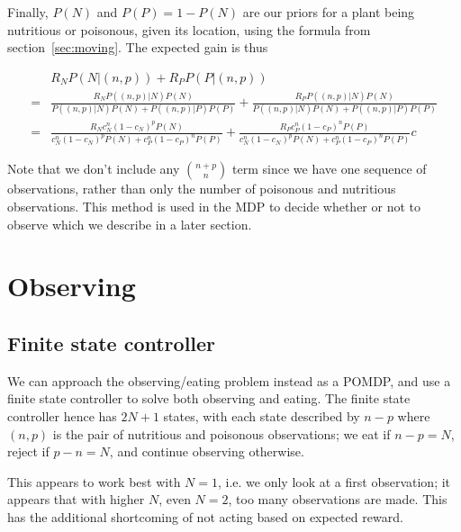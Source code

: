 \documentclass{article}
\begin{document}
Finally, $P(N)$ and $P(P)=1-P(N)$ are our priors for a plant being
nutritious or poisonous, given its location, using the formula from
section~\ref{sec:moving}. The expected gain is thus

\begin{align*}
  &R_N P(N|(n,p)) +R_P  P(P|(n,p))\\
  =&\frac{R_NP((n,p)|N) P(N)}{P((n,p)|N)P(N)+P((n,p)|P)P(P)} + \frac{R_PP((n,p)|N)P(N)}{P((n,p)|N)P(N)+P((n,p)|P)P(P)}\\
  =&\frac{R_Nc_N^n(1-c_N)^p P(N)}{ c_N^n(1-c_N)^p P(N) +  c_P^n(1-c_P)^n P(P)} + \frac{R_P c_P^n(1-c_P)^n P(P) }{ c_N^n(1-c_N)^p P(N)+c_P^n(1-c_P)^n P(P)}c
\end{align*}

Note that we don't include any ${n+p\choose n}$ term since we have one
sequence of observations, rather than only the number of poisonous and
nutritious observations.  This method is used in the MDP to decide
whether or not to observe which we describe in a later section.


\section{Observing}
\subsection{Finite state controller}
We can approach the observing/eating problem instead as a POMDP, and
use a finite state controller to solve both observing and eating.  The
finite state controller hence has $2N+1$ states, with each state
described by $n-p$ where $(n,p)$ is the pair of nutritious and
poisonous observations; we eat if $n-p=N$, reject if $p-n=N$, and
continue observing otherwise.

This appears to work best with $N=1$, i.e. we only look at a first
observation; it appears that with higher $N$, even $N=2$, too many
observations are made. This has the additional shortcoming of not
acting based on expected reward.


\end{document}
